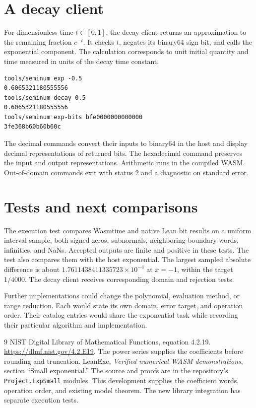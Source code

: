 \section{A decay client}
For dimensionless time $t\in[0,1]$, the decay client returns an approximation
to the remaining fraction $e^{-t}$.  It checks $t$, negates its binary64 sign
bit, and calls the exponential component.  The calculation corresponds to
unit initial quantity and time measured in units of the decay time constant.

\begin{lstlisting}
tools/seminum exp -0.5
0.6065321180555556
tools/seminum decay 0.5
0.6065321180555556
tools/seminum exp-bits bfe0000000000000
3fe368b60b60b60c
\end{lstlisting}

The decimal commands convert their inputs to binary64 in the host and display
decimal representations of returned bits.  The hexadecimal command preserves
the input and output representations.  Arithmetic runs in the compiled WASM.
Out-of-domain commands exit with status 2 and a diagnostic on standard error.

\section{Tests and next comparisons}
The execution test compares Wasmtime and native Lean bit results on a uniform
interval sample, both signed zeros, subnormals, neighboring boundary words,
infinities, and NaNs.  Accepted outputs are finite and positive in these tests.
The test also compares them with the host exponential.  The largest sampled
absolute difference is about $1.7611438411335723\times10^{-4}$ at $x=-1$,
within the target $1/4000$.  The decay client receives corresponding domain
and rejection tests.

Further implementations could change the polynomial, evaluation method, or
range reduction.  Each would state its own domain, error target, and operation
order.  Their catalog entries would share the exponential task while recording
their particular algorithm and implementation.

\begin{thebibliography}{9}
 NIST Digital Library of Mathematical Functions, equation 4.2.19.
\url{https://dlmf.nist.gov/4.2.E19}.
The power series supplies the coefficients before rounding and truncation.
 LeanExe, \emph{Verified numerical WASM demonstrations},
section ``Small exponential.''  The source and proofs are in the repository's
\texttt{Project.ExpSmall} modules.  This development supplies the coefficient
words, operation order, and existing model theorem.  The new library integration
has separate execution tests.
\end{thebibliography}

